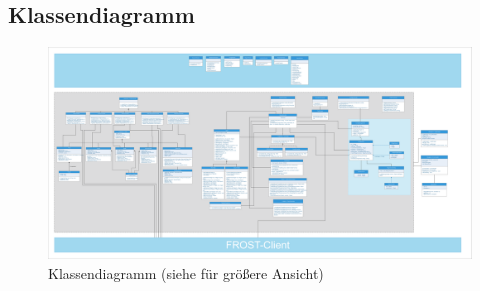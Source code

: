 \clearpage
\subsection{Klassendiagramm}

\begin{figure}[!h]
\centering
\includegraphics[angle =90, scale=0.13]{Klassendiagramm/klassendiagramm.eps}
\caption{Klassendiagramm (siehe  für größere Ansicht)}
\end{figure}